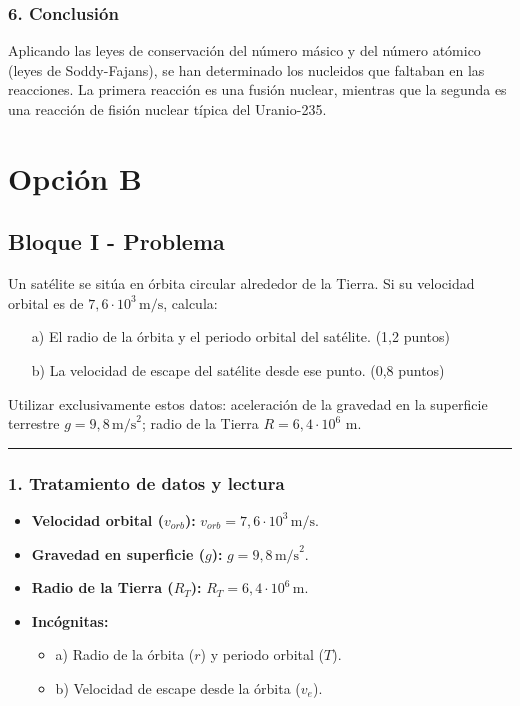 \subsubsection*{6. Conclusión}
\begin{cajaconclusion}
Aplicando las leyes de conservación del número másico y del número atómico (leyes de Soddy-Fajans), se han determinado los nucleidos que faltaban en las reacciones. La primera reacción es una fusión nuclear, mientras que la segunda es una reacción de fisión nuclear típica del Uranio-235.
\end{cajaconclusion}

\newpage

\section{Opción B}
\label{sec:B_2010_sep_ext}

\subsection{Bloque I - Problema}
\label{subsec:B1_2010_sep_ext}

\begin{cajaenunciado}
Un satélite se sitúa en órbita circular alrededor de la Tierra. Si su velocidad orbital es de $7,6\cdot10^{3}\,\text{m/s}$, calcula:
\begin{enumerate}
    \item[a)] El radio de la órbita y el periodo orbital del satélite. (1,2 puntos)
    \item[b)] La velocidad de escape del satélite desde ese punto. (0,8 puntos)
\end{enumerate}
Utilizar exclusivamente estos datos: aceleración de la gravedad en la superficie terrestre $g=9,8\,\text{m/s}^2$; radio de la Tierra $R=6,4\cdot10^{6}$ m.
\end{cajaenunciado}
\hrule

\subsubsection*{1. Tratamiento de datos y lectura}
\begin{itemize}
    \item \textbf{Velocidad orbital ($v_{orb}$):} $v_{orb} = 7,6 \cdot 10^3 \, \text{m/s}$.
    \item \textbf{Gravedad en superficie ($g$):} $g = 9,8 \, \text{m/s}^2$.
    \item \textbf{Radio de la Tierra ($R_T$):} $R_T = 6,4 \cdot 10^6 \, \text{m}$.
    \item \textbf{Incógnitas:}
    \begin{itemize}
        \item a) Radio de la órbita ($r$) y periodo orbital ($T$).
        \item b) Velocidad de escape desde la órbita ($v_e$).
    \end{itemize}
\end{itemize}

